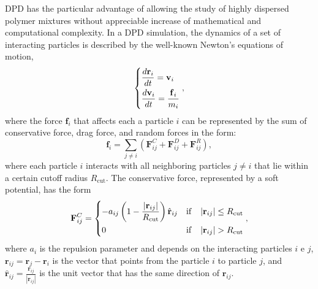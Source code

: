 \documentclass[
aip,
jcp,
reprint,
]{revtex4-1}
\newcommand{\vt}[1]{\boldsymbol{\mathbf{#1}}}          %
\begin{document}
DPD has the particular advantage of allowing the study of highly dispersed polymer mixtures without appreciable increase of mathematical and computational complexity.
In a DPD simulation, the dynamics of a set of interacting particles is described by the well-known Newton's equations of motion,
\begin{equation}
\begin{dcases}
\frac{d {\vt r}_i}{dt} = {\vt v}_i \\
\frac{d {\vt v}_i}{dt} = \frac{{\vt f}_i}{m_i}
\end{dcases},
\end{equation}
where the force ${\vt f}_i$ that affects each a particle $i$ can be represented by the sum of conservative force, drag force, and random forces in the form:
\begin{equation}
{\vt f}_i = \sum_{j \neq i} ({\vt F}^C_{ij} + {\vt F}^D_{ij} + {\vt F}^R_{ij}),
\end{equation}
where each particle $i$ interacts with all neighboring particles $j \neq i$ that lie within a certain cutoff radius $R_\mathrm{cut}$.
The conservative force, represented by a soft potential, has the form \cite{Groot_1997}
\begin{equation}
\label{eq:conservative force}
{\vt F}^C_{ij} = \begin{dcases}
-a_{ij} \left(1 - \frac{|{\vt r}_{ij}|}{R_\mathrm{cut}}\right) \hat{\vt r}_{ij} & \mathrm{if} \quad |{\vt r}_{ij}| \leq R_\mathrm{cut} \\
0 & \mathrm{if} \quad |{\vt r}_{ij}| > R_\mathrm{cut}
\end{dcases},
\end{equation}
where $a_i$ is the repulsion parameter and depends on the interacting particles $i$ e $j$, ${\vt r}_{ij} = {\vt r}_j - {\vt r}_i$ is the vector that points from the particle $i$ to particle $j$, and $\hat{\vt r}_{ij} = \frac{{\vt r}_{ij}}{|{\vt r}_{ij}|}$ is the unit vector that has the same direction of ${\vt r}_{ij}$.
\end{document}

